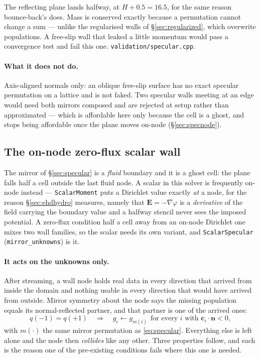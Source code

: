 \documentclass[11pt,a4paper]{article}
\newcommand{\code}[1]{\texttt{\small #1}}
\newcommand{\nn}{\bm{n}}
\begin{document}
\noindent The reflecting plane lands halfway, at $H+0.5=16.5$, for the same
reason bounce-back's does. Mass is conserved exactly because a permutation cannot
change a sum --- unlike the regularised walls of \S\ref{sec:regularized}, which
overwrite populations. A free-slip wall that leaked a little momentum would pass
a convergence test and fail this one. \code{validation/specular.cpp}.

\paragraph{What it does not do.} Axis-aligned normals only: an oblique free-slip
surface has no exact specular permutation on a lattice and is not faked. Two
specular walls meeting at an edge would need both mirrors composed and are
rejected at setup rather than approximated --- which is affordable here only
because the cell is a ghost, and stops being affordable once the plane moves
on-node (\S\ref{sec:specnode}).

\subsection{The on-node zero-flux scalar wall}
\label{sec:scalarspec}

The mirror of \S\ref{sec:specular} is a \emph{fluid} boundary and it is a ghost
cell: the plane falls half a cell outside the last fluid node. A scalar in this
solver is frequently on-node instead --- \code{ScalarMoment} puts a Dirichlet
value exactly \emph{at} a node, for the reason \S\ref{sec:ehdhydro} measures,
namely that $\bm{E}=-\nabla\varphi$ is a \emph{derivative} of the field carrying the
boundary value and a halfway stencil never sees the imposed potential. A
zero-flux condition half a cell away from an on-node Dirichlet one mixes two wall
families, so the scalar needs its own variant, and \code{ScalarSpecular}
(\code{mirror\_unknowns}) is it.

\paragraph{It acts on the unknowns only.} After streaming, a wall node holds real
data in every direction that arrived from inside the domain and nothing usable in
every direction that would have arrived from outside. Mirror symmetry about the
node says the missing population equals its normal-reflected partner, and that
partner is one of the arrived ones:
\begin{equation}
  q(-1)=q(+1) \quad\Longrightarrow\quad
  g_i \leftarrow g_{m(i)} \ \ \text{for every } i \text{ with }
  \bm{c}_i\!\cdot\!\nn < 0 ,
  \label{eq:scalarspec}
\end{equation}
with $m(\cdot)$ the same mirror permutation as \eqref{eq:specular}. Everything
else is left alone and the node then \emph{collides} like any other. Three
properties follow, and each is the reason one of the pre-existing conditions
fails where this one is needed.
\end{document}
